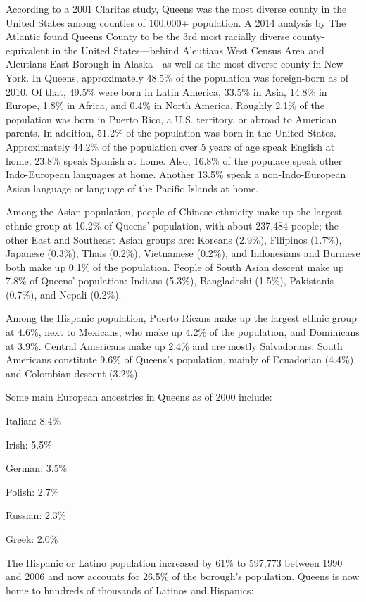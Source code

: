 According to a 2001 Claritas study, Queens was the most diverse county
in the United States among counties of 100,000+ population. A 2014
analysis by The Atlantic found Queens County to be the 3rd most racially
diverse county-equivalent in the United States---behind Aleutians West
Census Area and Aleutians East Borough in Alaska---as well as the most
diverse county in New York. In Queens, approximately 48.5\% of the
population was foreign-born as of 2010. Of that, 49.5\% were born in
Latin America, 33.5\% in Asia, 14.8\% in Europe, 1.8\% in Africa, and
0.4\% in North America. Roughly 2.1\% of the population was born in
Puerto Rico, a U.S. territory, or abroad to American parents. In
addition, 51.2\% of the population was born in the United States.
Approximately 44.2\% of the population over 5 years of age speak English
at home; 23.8\% speak Spanish at home. Also, 16.8\% of the populace
speak other Indo-European languages at home. Another 13.5\% speak a
non-Indo-European Asian language or language of the Pacific Islands at
home.

Among the Asian population, people of Chinese ethnicity make up the
largest ethnic group at 10.2\% of Queens' population, with about 237,484
people; the other East and Southeast Asian groups are: Koreans (2.9\%),
Filipinos (1.7\%), Japanese (0.3\%), Thais (0.2\%), Vietnamese (0.2\%),
and Indonesians and Burmese both make up 0.1\% of the population. People
of South Asian descent make up 7.8\% of Queens' population: Indians
(5.3\%), Bangladeshi (1.5\%), Pakistanis (0.7\%), and Nepali (0.2\%).

Among the Hispanic population, Puerto Ricans make up the largest ethnic
group at 4.6\%, next to Mexicans, who make up 4.2\% of the population,
and Dominicans at 3.9\%. Central Americans make up 2.4\% and are mostly
Salvadorans. South Americans constitute 9.6\% of Queens's population,
mainly of Ecuadorian (4.4\%) and Colombian descent (3.2\%).

Some main European ancestries in Queens as of 2000 include:

Italian: 8.4\%

Irish: 5.5\%

German: 3.5\%

Polish: 2.7\%

Russian: 2.3\%

Greek: 2.0\%

The Hispanic or Latino population increased by 61\% to 597,773 between
1990 and 2006 and now accounts for 26.5\% of the borough's population.
Queens is now home to hundreds of thousands of Latinos and Hispanics:

